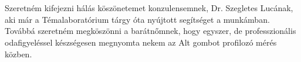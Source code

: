 \chapter*{\koszonetnyilvanitas}

Szeretném kifejezni hálás köszönetemet konzulensemnek, Dr. Szegletes Lucának, aki már a Témalaboratórium tárgy óta nyújtott segítséget a munkámban. Továbbá szeretném megköszönni a barátnőmnek, hogy egyszer, de professzionális odafigyeléssel készségesen megnyomta nekem az Alt gombot profilozó mérés közben.